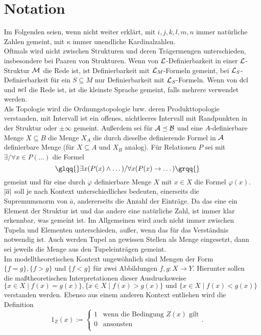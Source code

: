 \chapter*{Notation}
Im Folgenden seien, wenn nicht weiter erklärt, mit $i,j,k,l,m,n$ immer natürliche Zahlen gemeint, mit $\kappa$ immer unendliche Kardinalzahlen.\\
Oftmals wird nicht zwischen Strukturen und deren Trägermengen unterschieden, insbesondere bei Paaren von Strukturen. Wenn von $\mathcal{L}$-Definierbarkeit in einer $\mathcal{L}$-Struktur $\mathcal{M}$ die Rede ist, ist Definierbarkeit mit $\mathcal{L}_M$-Formeln gemeint, bei $\mathcal{L}_S$-Definierbarkeit für ein $S\subseteq M$ nur Definierbarkeit mit $\mathcal{L}_S$-Formeln. Wenn von $\operatorname{dcl}$ und $\operatorname{acl}$ die Rede ist, ist die kleinste Sprache gemeint, falls mehrere verwendet werden.\\
Als Topologie wird die Ordnungstopologie bzw. deren Produkttopologie verstanden, mit \glqq{}Intervall\grqq{} ist ein offenes, nichtleeres Intervall mit Randpunkten in der Struktur oder $\pm\infty$ gemeint. Außerdem sei für $\mathcal{A}\preceq \mathcal{B}$ und eine $A$-definierbare Menge $X\subseteq B$ die Menge $X_A$ die durch dieselbe definierende Formel in $\mathcal{A}$ definierbare Menge (für $X\subseteq A$ und $X_B$ analog). Für Relationen $P$ sei mit \glqq{}$\exists/\forall x\in P(\dots)$\grqq{} die Formel $$\glqq{}\exists x(P(x)\land\dots)/\forall x(P(x)\rightarrow\dots)\grqq{}$$ gemeint und für eine durch $\varphi$ definierbare Menge $X$ mit \glqq{}$x\in X$\grqq{} die Formel $\varphi(x)$.\\
${\left| \overline{a} \right|}$ soll je nach Kontext unterschiedliches bedeuten, einerseits die Supremumsnorm von $\overline{a}$, andererseits die Anzahl der Einträge. Da das eine ein Element der Struktur ist und das andere eine natürliche Zahl, ist immer klar erkennbar, was gemeint ist. Im Allgemeinen wird auch nicht immer zwischen Tupeln und Elementen unterschieden, außer, wenn das für das Verständnis notwendig ist. Auch werden Tupel an gewissen Stellen als Menge eingesetzt, dann sei jeweils die Menge aus den Tupeleinträgen gemeint.\\
Im modelltheoretischen Kontext ungewöhnlich sind Mengen der Form $\{f=g\},\{f>g\}$ und $\{f<g\}$ für zwei Abbildungen $f,g:X\rightarrow Y$. Hierunter sollen die maßtheoretischen Interpretationen dieser Ausdrucksweise $$\{x\in X\mid f(x)=g(x)\},\{x\in X\mid f(x)>g(x)\}\text{ und }\{x\in X\mid f(x)<g(x)\}$$ verstanden werden. Ebenso aus einem anderen Kontext entliehen wird die Definition
$$1_Z(x):=\left\{\begin{array}{ll}
1&\text{wenn die Bedingung }Z(x)\text{ gilt}\\
0&\text{ansonsten}\\
\end{array}\right..$$